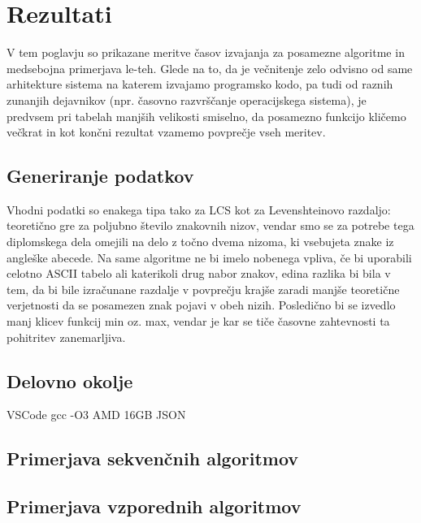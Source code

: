 \documentclass[a4paper,12pt,openright]{book}
\begin{document}
\chapter{Rezultati}

V tem poglavju so prikazane meritve časov izvajanja za posamezne algoritme in medsebojna primerjava le-teh. Glede na to, da je večnitenje zelo odvisno od same arhitekture sistema na katerem izvajamo programsko kodo, pa tudi od raznih zunanjih dejavnikov (npr. časovno razvrščanje operacijskega sistema), je predvsem pri tabelah manjših velikosti smiselno, da posamezno funkcijo kličemo večkrat in kot končni rezultat vzamemo povprečje vseh meritev. 

\section{Generiranje podatkov}

Vhodni podatki so enakega tipa tako za LCS kot za Levenshteinovo razdaljo: teoretično gre za poljubno število znakovnih nizov, vendar smo se za potrebe tega diplomskega dela omejili na delo z točno dvema nizoma, ki vsebujeta znake iz angleške abecede. Na same algoritme ne bi imelo nobenega vpliva, če bi uporabili celotno ASCII tabelo ali katerikoli drug nabor znakov, edina razlika bi bila v tem, da bi bile izračunane razdalje v povprečju krajše zaradi manjše teoretične verjetnosti da se posamezen znak pojavi v obeh nizih. Posledično bi se izvedlo manj klicev funkcij min oz. max, vendar je kar se tiče časovne zahtevnosti ta pohitritev zanemarljiva. 

\section{Delovno okolje}

VSCode
gcc
-O3 \cite{compilerFlag}
AMD
16GB
JSON



\section{Primerjava sekvenčnih algoritmov}



\section{Primerjava vzporednih algoritmov}
\end{document}

